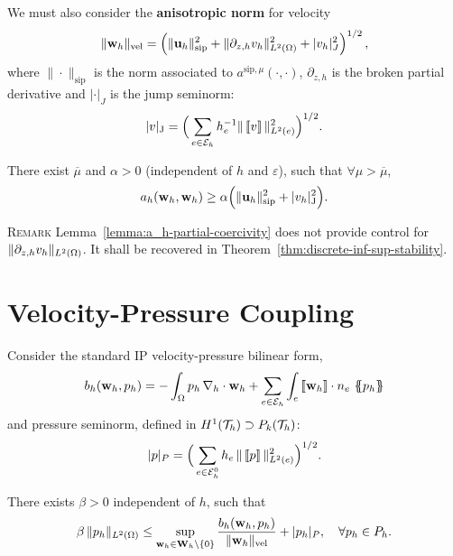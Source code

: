 \documentclass[25pt, a0paper, portrait, leqno, margin=0mm, innermargin=25mm,
blockverticalspace=15mm, colspace=15mm, subcolspace=8mm]{tikzposter}
\begin{document}
{\begin{multicols*}{3}
    We must also consider the \textbf{anisotropic norm} for velocity
    $$
    \|\wh\|_\mathrm{vel} = \left(\|\uh\|_{\text{sip}}^2 +
      \|\partial_{z,h}\vh\|_{L^2(\Omega)}^2 + |\vh|_J^2\right)^{1/2},
    $$
    where $\|\cdot\|_{\text{sip}}$ is the norm associated to
    $a^{\text{sip},\mu}(\cdot,\cdot)$, $\partial_{z,h}$ is the broken
    partial derivative and $|\cdot|_J$ is the jump seminorm:
    $$
    \seminormJ{\vv} = \Big (\sum_{e\in\Eh} h_e^{-1} \norm[L^2(e)]{\jump\vv}^2 \Big ) ^{1/2}.
    $$

    \begin{lemma}
      \label{lemma:a_h-partial-coercivity}
      There exist $\overline{\mu} $ and $ \alpha >0$  (independent of $h$ and  $\varepsilon$), such that
      $ \forall \mu > \overline{\mu}$,
      $$
        a_h ( \wh, \wh ) \ge \alpha \Big ( \normsip{\uh}^2
        + \seminormJ{\vh}^2  \Big ).
        $$
    \end{lemma}

    \begin{paragraph}{\textsc{Remark}}
      Lemma~\ref{lemma:a_h-partial-coercivity} does not provide
      control for $\|\partial_{z,h} \vh\|_{L^2(\Omega)}$. It shall be
      recovered in Theorem~\ref{thm:discrete-inf-sup-stability}.
    \end{paragraph}

    \section{\color{colorTwo}Velocity-Pressure  Coupling\dotfill}

    Consider the standard IP velocity-pressure bilinear form,
    $$
    b_h(\wh, \ph )= -\int_{\Omega} \ph\, \gradh \cdot \wh +
    \sum_{e\in\Eh} \int_e \jump{\wh} \cdot n_e\, \average{\ph}
    $$
    and pressure seminorm, defined in
    $ H^1(\Th ) \supset P_{k}( \Th )$:
    $$
    |p|_P  = \Big ( \sum_{e\in\Ehi} h_e \, \| \jump{p} \|_{L^2(e)}^2 \Big )^{1/2}.
    $$

    \begin{lemma} There exists
      \label{lemma:b_h-stability}
      $\beta > 0$ independent of $h$, such that
      $$
      \beta \, \| \ph \|_{L^2(\Omega)} \le \sup_{\wh \in \Wh \setminus
        \{0\}} \frac{b_h ( \wh, \ph )}{\normvel{\wh}}
      + |\ph|_P , \quad \forall \ph \in \Ph.
      $$
    \end{lemma}


\end{multicols*}}
\end{document}
